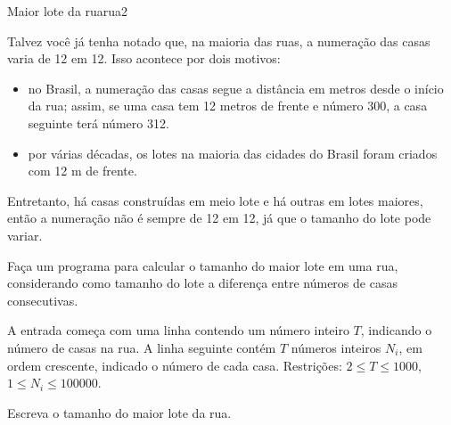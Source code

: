 \documentclass[12pt,a4paper,oneside]{article}
\begin{document}
\begin{problem}{Maior lote da rua}{rua}{2}

Talvez você já tenha notado que, na maioria das ruas, a numeração das casas varia de 12 em 12.
Isso acontece por dois motivos:

\begin{itemize}
\item no Brasil, a numeração das casas segue a distância em metros desde o início da rua;
assim, se uma casa tem 12 metros de frente e número 300, a casa seguinte terá número 312.
\item por várias décadas, os lotes na maioria das cidades do Brasil foram criados com 12 m de frente.
\end{itemize}

Entretanto, há casas construídas em meio lote e há outras em lotes maiores, então a numeração não é sempre de 12 em 12, já que o tamanho do lote pode variar.

Faça um programa para calcular o tamanho do maior lote em uma rua, considerando como tamanho do lote a diferença entre números de casas consecutivas.

%

\InputFile

A entrada começa com uma linha contendo um número inteiro $T$, indicando o número de casas na rua.
A linha seguinte contém $T$ números inteiros $N_i$, em ordem crescente, indicado o número de cada casa.
Restrições: $2 \leq T \leq 1000$, $1 \leq N_i \leq 100000$.

\OutputFile

Escreva o tamanho do maior lote da rua.


\Example

\begin{example}
%
\end{example}

\begin{example}
%
\end{example}

\begin{example}
%
\end{example}


\end{problem}
\end{document}

